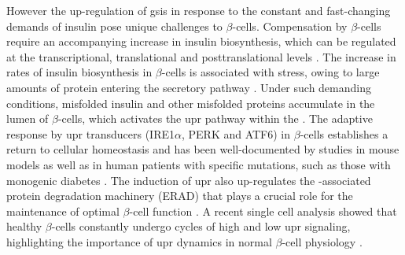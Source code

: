 \par However the up-regulation of \gls{gsis} in response to the constant and fast-changing demands of insulin pose unique challenges to $\beta$-cells. Compensation by $\beta$-cells require an accompanying increase in insulin biosynthesis, which can be regulated at the transcriptional, translational and posttranslational levels \textbf{\cite{prentki_islet_2006}}. The increase in rates of insulin biosynthesis in $\beta$-cells is associated with  stress, owing to large amounts of protein entering the secretory pathway \textbf{\cite{yong_therapeutic_2021}}.
Under such demanding conditions, misfolded insulin and other misfolded proteins accumulate in the  lumen of $\beta$-cells, which activates the \gls{upr} pathway within the  \textbf{\cite{miranda_pancreatic_2021}}. The adaptive response by \gls{upr} transducers (IRE1$\alpha$, PERK and ATF6)  in $\beta$-cells establishes a return to cellular homeostasis and has been well-documented by studies in mouse models as well as in human patients with specific mutations, such as those with monogenic diabetes \textbf{\cite{yong_therapeutic_2021}}. The induction of \gls{upr} also up-regulates the -associated protein degradation machinery (ERAD) that plays a crucial role for the maintenance of optimal $\beta$-cell function \textbf{\cite{yong_therapeutic_2021}}. A recent single cell analysis showed that healthy $\beta$-cells constantly undergo cycles of high and low \gls{upr} signaling, highlighting the importance of \gls{upr} dynamics in normal $\beta$-cell physiology \textbf{\cite{xin_pseudotime_2018}}.\\


